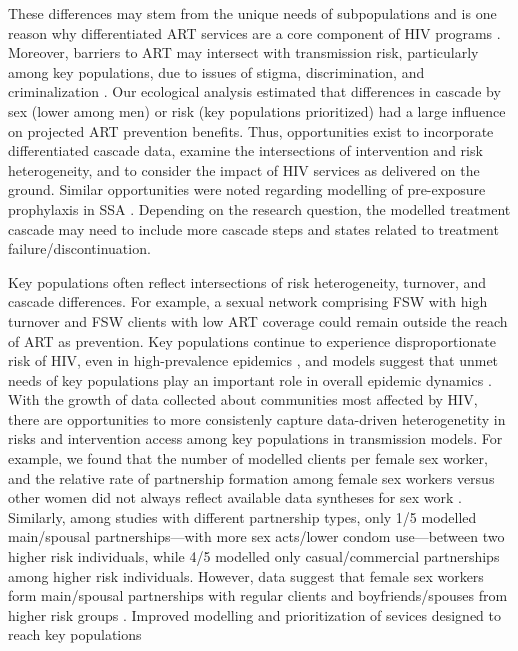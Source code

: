 These differences may stem from the unique needs of subpopulations
and is one reason why differentiated ART services are a core component of HIV programs
\cite{Chikwari2018,Ehrenkranz2019}.
Moreover, barriers to ART may intersect with transmission risk, particularly among key populations,
due to issues of stigma, discrimination, and criminalization \cite{Ortblad2019,Baral2019}.
Our ecological analysis estimated that
differences in cascade by sex (lower among men) or risk (key populations prioritized)
had a large influence on projected ART prevention benefits.
Thus, opportunities exist to incorporate differentiated cascade data,
examine the intersections of intervention and risk heterogeneity, and
to consider the impact of HIV services as delivered on the ground.
Similar opportunities were noted regarding modelling of pre-exposure prophylaxis in SSA \cite{Case2019}.
Depending on the research question, the modelled treatment cascade may need
to include more cascade steps and states related to treatment failure/discontinuation.
\par
Key populations often reflect intersections of risk heterogeneity, turnover, and cascade differences.
For example, a sexual network comprising FSW with high turnover and FSW clients with low ART coverage
could remain outside the reach of ART as prevention.
Key populations continue to experience disproportionate risk of HIV,
even in high-prevalence epidemics \cite{Baral2012,Beyrer2012},
and models suggest that unmet needs of key populations
play an important role in overall epidemic dynamics \cite{Bekker2015,Stone2021}.
With the growth of data collected about communities most affected by HIV,
there are opportunities to more consistenly capture
data-driven heterogenetity in risks and intervention access among key populations in transmission models.
For example, we found that the number of modelled clients per female sex worker, and
the relative rate of partnership formation among female sex workers versus other women
did not always reflect available data syntheses for sex work \cite{Watts2010,Scorgie2012}.
Similarly, among studies with different partnership types, only 1/5 modelled
main/spousal partnerships---with more sex acts/lower condom use---between two higher risk individuals,
while 4/5 modelled only casual/commercial partnerships among higher risk individuals.
However, data suggest that female sex workers form main/spousal partnerships
with regular clients and boyfriends/spouses from higher risk groups \cite{Scorgie2012}.
Improved modelling and prioritization of sevices designed to reach key populations
